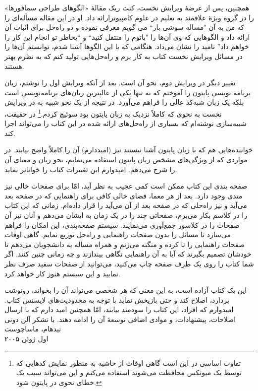 \documentclass{book}
\begin{document}
همچنین، پس از عرضهٔ ویرایش نخست، کنث ریک  مقالهٔ «الگوهای طراحی سمافورها»%
را در گروه ویژهٔ   علاقمند به تعلیم در علوم کامپیوترارائه داد.
او در این مقاله مسأله‌ای را که من به آن "مساله سوشی بار`` می گویم معرفی نموده و 
دو راه‌حل برای اثبات آن  ارائه داد و الگوهایی که وی آن‌ها را "باتوم را منتقل کنید`` 
و ``بخاطر تو انجام این کار را خواهم داد'' نامید را نشان می‌داد.
هنگامی که با این الگوها آشنا شدم، توانستم آن‌ها را در مسائل ویرایش نخست کتاب به کار برم و راه‌حل‌هایی تولید کنم که به نظرم بهتر هستند.

تغییر دیگر در ویرایش دوم، نحو آن است. 
بعد از آنکه ویرایش اول را نوشتم، زبان برنامه نویسی پایتون را آموختم 
که نه تنها یکی از عالیترین زبان‌های برنامه‌نویسی است بلکه یک زبان شبه‌کد عالی را فراهم می‌آورد. 
در نتیجه از یک نحو شبیه به  در ویرایش نخست به نحوی که کاملاً نزدیک به زبان پایتون بود سوئیچ کردم.\footnote{تفاوت اساسی در این است 
گاهی اوقات از حاشیه به منظور نمایش کدهایی که توسط یک میوتکس محافظت می‌شوند استفاده می‌کنم و این می‌تواند سبب یک خطای نحوی در پایتون شود.}
در حقیقت، شبیه‌سازی نوشته‌ام که بسیاری از راه‌حل‌های ارائه شده در این کتاب را می‌تواند اجرا کند. 

خواننده‌هایی هم که با زبان پایتون آشنا نیستند نیز (امیددارم) آن را کاملاً واضح بیابند.
در مواردی که از ویژگی‌های مشخص زبان پایتون استفاده می‌نمایم، نحو زبان  و معنای آن را شرح می‌دهم. امیدوارم این تغییرات کتاب را خواناتر نماید.

صفحه بندی این کتاب ممکن است کمی عجیب به نظر آید،  امّا برای صفحات خالی نیز متدی وجود دارد. 
بعد از هر معما، فضای خالی کافی برای راهنمایی که در صفحه بعد می‌آید و نیز راه‌حلی که در صفحه بعد از آن می‌آید را قرار داده‌ام. 
زمانی که این کتاب را در کلاسم بکار می‌برم، صفحاتی چند را در یک زمان به ایشان می‌دهم و آنان نیز آن صفحات را در کلاسور جمع‌آوری می‌نمایند. 
سیستم صفحه‌بندی، این امکان را فراهم می‌سازد تا مسائل را بدون صفحات  راهنمایی و راه‌حل توزیع نمایم. 
گاهی اوقات صفحات راهنمایی را تا کرده و منگنه می‌زنم و همراه مساله به دانشجویان می‌دهم تا خودشان تصمیم بگیرند که آیا به آن راهنمایی 
نگاهی بیندازند و چه زمانی چنین کنند. 
اگر شما کتاب را روی یک طرف صفحه چاپ می‌کنید، می‌توانید از صفحات سفید صرف نظر نمایید و این سیستم هنوز کار خواهد کرد. 

این یک کتاب آزاده است، به این معنی که هر شخصی می‌تواند آن را بخواند، رونوشت بردارد، اصلاح کند و حتی بازپخش نماید  با توجه به 
محدودیت‌های لایسنس کتاب. 
امیدوارم که افراد، این کتاب را سودمند بیابند، امّا همچنین امید دارم که با ارسال اصلاحات، پیشنهادات، و موادی اضافی توسعهٔ‌ آن را ادامه دهند. 
با تشکر
\vspace{0.3in}
\noindent آلن دونی \\
\noindent نیدهام، ماساچوست \\
\noindent اول ژوئن ۲۰۰۵
\end{document}
